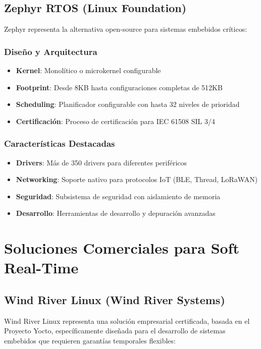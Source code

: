     \newpage
    \subsection{Zephyr RTOS (Linux Foundation)}
        Zephyr representa la alternativa open-source para sistemas embebidos críticos:

        \subsubsection{Diseño y Arquitectura}
            \begin{itemize}
                \item \textbf{Kernel}: Monolítico o microkernel configurable
                \item \textbf{Footprint}: Desde 8KB hasta configuraciones completas de 512KB
                \item \textbf{Scheduling}: Planificador configurable con hasta 32 niveles de prioridad
                \item \textbf{Certificación}: Proceso de certificación para IEC 61508 SIL 3/4
            \end{itemize}

        \subsubsection{Características Destacadas}
            \begin{itemize}
                \item \textbf{Drivers}: Más de 350 drivers para diferentes periféricos
                \item \textbf{Networking}: Soporte nativo para protocolos IoT (BLE, Thread, LoRaWAN)
                \item \textbf{Seguridad}: Subsistema de seguridad con aislamiento de memoria
                \item \textbf{Desarrollo}: Herramientas de desarrollo y depuración avanzadas
            \end{itemize}

\newpage
\section{Soluciones Comerciales para Soft Real-Time}
    \subsection{Wind River Linux (Wind River Systems)}
        Wind River Linux representa una solución empresarial certificada, basada en el Proyecto Yocto, específicamente diseñada para el desarrollo de sistemas embebidos que requieren garantías temporales flexibles:

